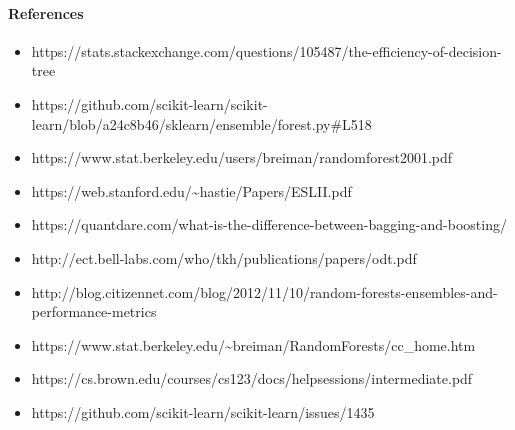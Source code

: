 \documentclass[11pt]{article}
\providecommand{\tightlist}{%
      \setlength{\itemsep}{0pt}\setlength{\parskip}{0pt}}
\begin{document}
    \paragraph{References}\label{references}

    \begin{itemize}
\tightlist
\item
  https://stats.stackexchange.com/questions/105487/the-efficiency-of-decision-tree
\item
  https://github.com/scikit-learn/scikit-learn/blob/a24c8b46/sklearn/ensemble/forest.py\#L518
\item
  https://www.stat.berkeley.edu/users/breiman/randomforest2001.pdf
\item
  https://web.stanford.edu/\textasciitilde{}hastie/Papers/ESLII.pdf
\item
  https://quantdare.com/what-is-the-difference-between-bagging-and-boosting/
\item
  http://ect.bell-labs.com/who/tkh/publications/papers/odt.pdf
\item
  http://blog.citizennet.com/blog/2012/11/10/random-forests-ensembles-and-performance-metrics
\item
  https://www.stat.berkeley.edu/\textasciitilde{}breiman/RandomForests/cc\_home.htm
\item
  https://cs.brown.edu/courses/cs123/docs/helpsessions/intermediate.pdf
\item
  https://github.com/scikit-learn/scikit-learn/issues/1435
\end{itemize}


    
    
    
    
\end{document}
